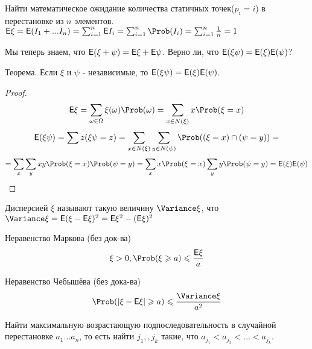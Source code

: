 \begin{example}
    Найти математическое ожидание количества статичных точек($p_i = i$) в перестановке из $n$ элементов.\\
    $\E\xi = \E(I_1 + ... I_n) = \sum_{i=1}^{n}\E I_i = \sum_{i=1}^{n}\P(I_i) = \sum_{i=1}^{n}\frac{1}{n}= 1$\\
\end{example}

Мы теперь знаем, что $\mathsf{E}(\xi + \psi) = \mathsf{E}\xi + \mathsf{E}\psi$. Верно ли, что $\mathsf{E}(\xi \psi) = \mathsf{E}(\xi)\mathsf{E}(\psi)$? \par
Теорема. Если $\xi$ и $\psi$ - независимые, то $\mathsf{E}(\xi \psi) = \mathsf{E}(\xi) \mathsf{E}(\psi)$.\\
\begin{proof}
    \[
        \E\xi=\sum_{\omega \in \Omega} \xi(\omega)\P(\omega)=\sum_{x\in N(\xi)}x\P(\xi = x)
    \]
    \[
        \E(\xi \psi) = \sum z(\xi \psi = z) = \sum_{x \in N(\xi)}\sum_{y \in N(\psi)} \P((\xi = x) \cap (\psi = y)) =
    \]
    \[
        =\sum_{x}\sum_{y}xy\P(\xi = x)\P(\psi = y) =
        \sum_{x}x\P(\xi = x) \sum_{y}y\P(\psi = y) = \E(\xi) \E(\psi)
    \]
\end{proof}

\begin{definition}
    Дисперсией $\xi$ называют такую величину $\D \xi$, что $\D\xi=\E(\xi - \E\xi)^2 = \E \xi^2 - (\E \xi)^2$
\end{definition}

\begin{theorem}{\rm Неравенство Маркова (без док-ва)}
    \[
        \xi > 0, \P(\xi \geqslant{a}) \leqslant{\frac{\E\xi}{a}}
    \]
\end{theorem}

\begin{theorem}{\rm Неравенство Чебышёва (без дока-ва)}
    \[
        \P(|\xi - \E\xi| \geqslant{a}) \leqslant{\frac{\D\xi}{a^2}}
    \]
\end{theorem}

\newpage
\begin{example}
    
    Найти максимальную возрастающую подпоследовательность в случайной перестановке $a_1...a_n$, то есть найти $j_1,,j_k$ такие, что $a_{j_1} < a_{j_2} < ... < a_{j_k}$.

    \begin{algorithm}
    \begin{algorithmic}
        \EndIf
      \EndFor
    \end{algorithmic}
    \end{algorithm}

\end{example}


